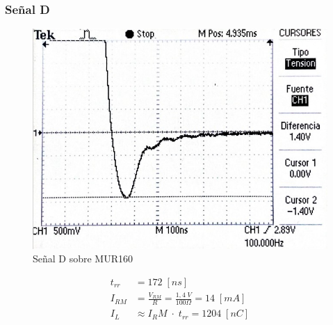 \documentclass{article}
\begin{document}
\subsubsection{Señal D}
\begin{figure}[h!]
 \begin{center}
	\includegraphics[scale=0.5]{imagenes/MUR_D.jpg} 
	\caption{Señal D sobre MUR160}
 \end{center}
\end{figure}
%
\begin{align*}
	t_{rr} &= 172 \; [ns] \\
	I_{RM}	&= \frac{V_{RM}}{R} = \frac{1,4 \; V}{100 \Omega} = 14 \; [mA] \\
	I_L	&\approx {I_RM} \; \cdot \; t_{rr} = 1204 \; [nC]
\end{align*}
%
\end{document}

